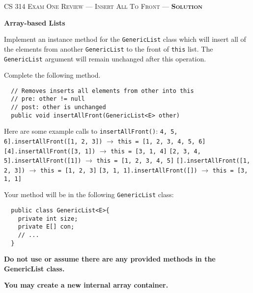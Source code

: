 \documentclass[12pt,letter]{article}
\begin{document}
\noindent\textsc{\large CS 314 Exam One Review --- Insert All To Front --- \textbf{Solution}}

\vspace{6pt}
\noindent\textbf{Array-based Lists}

\vspace{2pt}
\noindent Implement an instance method for the \texttt{GenericList} class which will 
insert all of the elements from another \texttt{GenericList} to the front of \texttt{this} list.
The \texttt{GenericList} argument will remain unchanged after this operation.

\vspace{4pt}
\noindent Complete the following method.
\begin{verbatim}
  // Removes inserts all elements from other into this
  // pre: other != null
  // post: other is unchanged
  public void insertAllFront(GenericList<E> other)
\end{verbatim}

\vspace{4pt}

\noindent Here are some example calls to \texttt{insertAllFront()}:
\newline
\noindent \texttt{4, 5, 6].insertAllFront([1, 2, 3])} $\rightarrow$ \texttt{this = [1, 2, 3, 4, 5, 6]}
\newline
\noindent \texttt{[4].insertAllFront([3, 1])} $\rightarrow$ \texttt{this = [3, 1, 4]}
\newline
\noindent \texttt{[2, 3, 4, 5].insertAllFront([1])} $\rightarrow$ \texttt{this = [1, 2, 3, 4, 5]}
\newline
\noindent \texttt{[].insertAllFront([1, 2, 3])} $\rightarrow$ \texttt{this = [1, 2, 3]}
\newline
\noindent \texttt{[3, 1, 1].insertAllFront([])} $\rightarrow$ \texttt{this = [3, 1, 1]}
\newline

\noindent Your method will be in the following \texttt{GenericList} class:

\begin{verbatim}
  public class GenericList<E>{
    private int size;
    private E[] con;
    // ...
  }

\end{verbatim}

\noindent \textbf{Do not use or assume there are any provided methods in the GenericList class.}

\noindent \textbf{You may create a new internal array container.}
\end{document}
